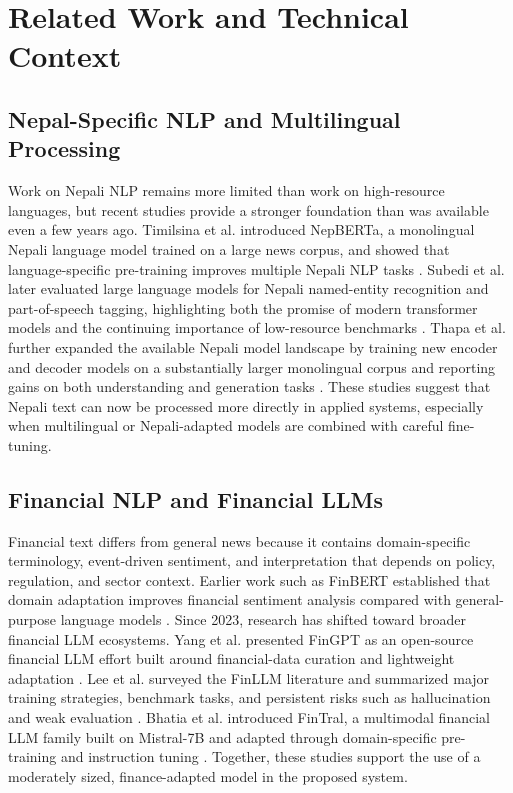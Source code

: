 \documentclass[12pt,a4paper]{report}
\begin{document}
\chapter{Related Work and Technical Context}

\section{Nepal-Specific NLP and Multilingual Processing}
Work on Nepali NLP remains more limited than work on high-resource languages, but recent studies provide a stronger foundation than was available even a few years ago. Timilsina et al. introduced NepBERTa, a monolingual Nepali language model trained on a large news corpus, and showed that language-specific pre-training improves multiple Nepali NLP tasks \cite{timilsina2022}. Subedi et al. later evaluated large language models for Nepali named-entity recognition and part-of-speech tagging, highlighting both the promise of modern transformer models and the continuing importance of low-resource benchmarks \cite{subedi2024}. Thapa et al. further expanded the available Nepali model landscape by training new encoder and decoder models on a substantially larger monolingual corpus and reporting gains on both understanding and generation tasks \cite{thapa2025}. These studies suggest that Nepali text can now be processed more directly in applied systems, especially when multilingual or Nepali-adapted models are combined with careful fine-tuning.

\section{Financial NLP and Financial LLMs}
Financial text differs from general news because it contains domain-specific terminology, event-driven sentiment, and interpretation that depends on policy, regulation, and sector context. Earlier work such as FinBERT established that domain adaptation improves financial sentiment analysis compared with general-purpose language models \cite{araci2019finbert}. Since 2023, research has shifted toward broader financial LLM ecosystems. Yang et al. presented FinGPT as an open-source financial LLM effort built around financial-data curation and lightweight adaptation \cite{yang2023fingpt}. Lee et al. surveyed the FinLLM literature and summarized major training strategies, benchmark tasks, and persistent risks such as hallucination and weak evaluation \cite{lee2024finllms}. Bhatia et al. introduced FinTral, a multimodal financial LLM family built on Mistral-7B and adapted through domain-specific pre-training and instruction tuning \cite{bhatia2024fintral}. Together, these studies support the use of a moderately sized, finance-adapted model in the proposed system.
\end{document}
